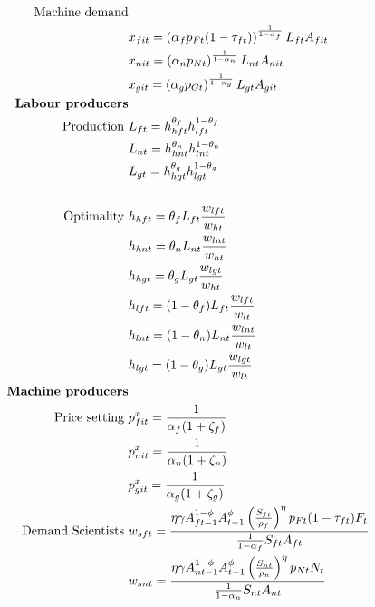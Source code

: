 \begin{align*}
\\
\text{Machine demand}&
\\
&x_{fit}= \left(\alpha_f p_{Ft}(1-\tau_{ft})\right)^\frac{1}{1-\alpha_f}L_{ft}A_{fit}\\
&x_{nit}= \left(\alpha_n p_{Nt}\right)^\frac{1}{1-\alpha_n}L_{nt}A_{nit}\\
&x_{git}= \left(\alpha_g p_{Gt}\right)^\frac{1}{1-\alpha_g}L_{gt}A_{git}
\\
\text{\textbf{Labour producers}}&
\\
\text{Production}\ \vspace{4mm}& L_{ft}=h_{hft}^{\theta_{f}}h_{lft}^{1-\theta_{f}}\\
& L_{nt}=h_{hnt}^{\theta_{n}}h_{lnt}^{1-\theta_{n}}\\
& L_{gt}=h_{hgt}^{\theta_{g}}h_{lgt}^{1-\theta_{g}}\\
\ \\
\text{Optimality}\ \vspace{4mm}& h_{hft}= \theta_{f}L_{ft}\frac{w_{lft}}{w_{ht}}\\ %
& h_{hnt}= \theta_{n}L_{nt}\frac{w_{lnt}}{w_{ht}}\\
& h_{hgt}= \theta_{g}L_{gt}\frac{w_{lgt}}{w_{ht}}\\
& h_{lft}= (1-\theta_{f})L_{ft}\frac{w_{lft}}{w_{lt}}\\%
& h_{lnt}= (1-\theta_{n}) L_{nt}\frac{w_{lnt}}{w_{lt}}\\
& h_{lgt}= (1-\theta_{g}) L_{gt}\frac{w_{lgt}}{w_{lt}}\\
%
\text{\textbf{Machine producers}}\\
\text{Price setting}\ \vspace{4mm}&p_{fit}^x=\frac{1}{\alpha_f(1+\zeta_f)}\\
&p_{nit}^x=\frac{1}{\alpha_n(1+\zeta_n)}\\
&p_{git}^x=\frac{1}{\alpha_g(1+\zeta_g)}
\\ 
\text{Demand Scientists}\ \vspace{4mm}&
w_{sft}=\frac{\eta \gamma A_{ft-1}^{1-\phi}A_{t-1}^{\phi}\left(\frac{S_{ft}}{\rho_f}\right)^{\eta}p_{Ft}(1-\tau_{ft})F_t}{\frac{1}{1-\alpha_f}S_{ft}A_{ft}}\\
&
w_{snt}=\frac{\eta \gamma  A_{nt-1}^{1-\phi}A_{t-1}^{\phi}\left(\frac{S_{nt}}{\rho_n}\right)^{\eta}p_{Nt}N_t}{\frac{1}{1-\alpha_n}S_{nt}A_{nt}}\\

\end{align*}
